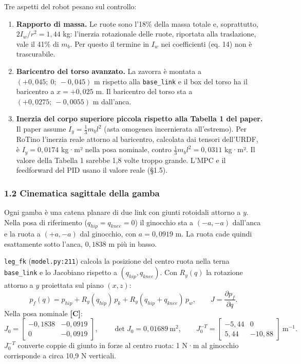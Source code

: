 \documentclass[
]{article}
\providecommand{\tightlist}{%
  \setlength{\itemsep}{0pt}\setlength{\parskip}{0pt}}
\begin{document}
Tre aspetti del robot pesano sul controllo:

\begin{enumerate}
\tightlist
\item \textbf{Rapporto di massa.} Le ruote sono l'18\% della massa totale e, soprattutto, \(2I_w/r^2 = 1{,}44\) kg: l'inerzia rotazionale delle ruote, riportata alla traslazione, vale il 41\% di \(m_b\). Per questo il termine in \(I_w\) nei coefficienti (eq. 14) non è trascurabile.
\item \textbf{Baricentro del torso avanzato.} La zavorra è montata a \((+0{,}045;\ 0;\ -0{,}045)\) m rispetto alla \texttt{base\_link} e il box del torso ha il baricentro a \(x = +0{,}025\) m. Il baricentro del torso sta a \((+0{,}0275;\ -0{,}0055)\) m dall'anca.
\item \textbf{Inerzia del corpo superiore piccola rispetto alla Tabella 1 del paper.} Il paper assume \(I_y = \tfrac13 m_b l^2\) (asta omogenea incernierata all'estremo). Per RoTino l'inerzia reale attorno al baricentro, calcolata dai tensori dell'URDF, è \(I_y = 0{,}0174\) kg·m² nella posa nominale, contro \(\tfrac13 m_b l^2 = 0{,}0311\) kg·m². Il valore della Tabella 1 sarebbe 1,8 volte troppo grande. L'MPC e il feedforward del PID usano il valore reale (§1.5).
\end{enumerate}

\subsubsection{1.2 Cinematica sagittale della gamba}\label{12-cinematica-sagittale-della-gamba}

Ogni gamba è una catena planare di due link con giunti rotoidali attorno a \(y\). Nella posa di riferimento (\(q_{hip} = q_{knee} = 0\)) il ginocchio sta a \((-a, -a)\) dall'anca e la ruota a \((+a, -a)\) dal ginocchio, con \(a = 0{,}0919\) m. La ruota cade quindi esattamente sotto l'anca, \(0{,}1838\) m più in basso.

\texttt{leg\_fk} (\texttt{model.py:211}) calcola la posizione del centro ruota nella terna \texttt{base\_link} e lo Jacobiano rispetto a \((q_{hip}, q_{knee})\). Con \(R_y(q)\) la rotazione attorno a \(y\) proiettata sul piano \((x,z)\): \[p_f(q) = p_{hip} + R_y(q_{hip})\,p_{k} + R_y(q_{hip}+q_{knee})\,p_{w}, \qquad J = \frac{\partial p_f}{\partial q} .\] Nella posa nominale \textbf{[C]}: \[J_0 = \begin{bmatrix} -0{,}1838 & -0{,}0919 \\ 0 & -0{,}0919\end{bmatrix}, \qquad \det J_0 = 0{,}01689\ \text{m}^2, \qquad J_0^{-T} = \begin{bmatrix} -5{,}44 & 0 \\ 5{,}44 & -10{,}88\end{bmatrix}\ \text{m}^{-1}.\] \(J_0^{-T}\) converte coppie di giunto in forze al centro ruota: 1 N·m al ginocchio corrisponde a circa 10,9 N verticali.
\end{document}
